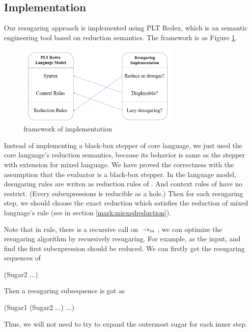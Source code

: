 \subsection{Implementation}

Our resugaring approach is implemented using PLT Redex\cite{SEwPR}, which is an semantic engineering tool based on reduction semantics\cite{reduction}. The framework is as Figure \ref{fig:frame}.

\begin{figure}[h]
	\centering
	\includegraphics[width=8cm]{images/frame.png}
	\caption{framework of implementation}
	\label{fig:frame}
\end{figure}

Instead of implementing a black-box stepper of core language, we just used the core language's reduction semantics, because its behavior is same as the stepper with extension for mixed language. We have proved the correctness with the assumption that the evaluator is a black-box stepper. In the language model, desugaring rules are writen as reduction rules of . And context rules of  have no restrict. (Every subexpressions is reducible as a hole.) Then for each resugaring step, we should choose the exact reduction which satisfies the reduction of mixed language's rule (see in section \ref{mark:miexedreduction}).

Note that in  rule, there is a recursive call on $~\rightarrow_m~$, we can optimize the resugaring algorithm by recursively resugaring. For example,  as the input, and find the first subexpression should be reduced. We can firstly get the resugaring sequences of 
\begin{Codes}
    (Sugar2 ...)
 
\end{Codes}
Then a resugaring subsequence is got as
\begin{Codes}
    (Sugar1 (Sugar2 ...) ...)
 
\end{Codes}
Thus, we will not need to try to expand the outermost sugar for each inner step.

